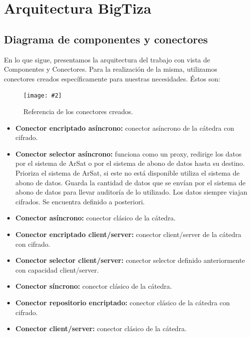 \documentclass[a4paper, 10pt, twoside]{article}
\newcommand{\diagramadeancho}[2]{
  \begin{center}
    \texttt{[image: \#2]}
  \end{center}
}
\begin{document}
\newpage

\section{Arquitectura BigTiza}

\subsection{Diagrama de componentes y conectores}
En lo que sigue, presentamos la arquitectura del trabajo con vista de Componentes y Conectores. Para la realización de la misma, utilizamos conectores creados específicamente para nuestras necesidades. Éstos son:

\begin{figure}[h!]
  \diagramadeancho{12cm}{./diagramas/referenciadeconectores.pdf}
  \caption{Referencia de los conectores creados.}
\end{figure}

\begin{itemize}
  \item \textbf{Conector encriptado asíncrono:} conector asíncrono de la cátedra con cifrado.
  \item \textbf{Conector selector asíncrono:} funciona como un proxy, redirige los datos por el sistema de ArSat o por el sistema de abono de datos hasta su destino. Prioriza el sistema de ArSat, si este no está disponible utiliza el sistema de abono de datos. Guarda la cantidad de datos que se envían por el sistema de abono de datos para llevar auditoría de lo utilizado. Los datos siempre viajan cifrados. Se encuentra definido a posteriori.
  \item \textbf{Conector asíncrono:} conector clásico de la cátedra.
  \item \textbf{Conector encriptado client/server:} conector client/server de la cátedra con cifrado.
  \item \textbf{Conector selector client/server:} conector selector definido anteriormente con capacidad client/server.
  \item \textbf{Conector síncrono:} conector clásico de la cátedra.
  \item \textbf{Conector repositorio encriptado:} conector clásico de la cátedra con cifrado.
  \item \textbf{Conector client/server:} conector clásico de la cátedra.

\end{itemize}

\newpage
\end{document}
